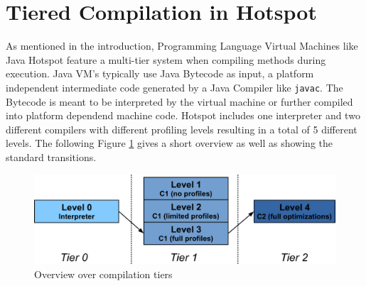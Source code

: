 \section{Tiered Compilation in Hotspot}
\label{sec:tiered}
As mentioned in the introduction, Programming Language Virtual Machines like Java Hotspot feature a multi-tier system when compiling methods during execution. 
Java VM's typically use Java Bytecode as input, a platform independent intermediate code generated by a Java Compiler like \texttt{javac}.
The Bytecode is meant to be interpreted by the virtual machine or further compiled into platform dependend machine code.
Hotspot includes one interpreter and two different compilers with different profiling levels resulting in a total of 5 different levels. The following Figure \ref{fig:hs_tiers} gives a short overview as well as showing the standard transitions.
\begin{figure}[h]
  \begin{center}
    \centering
    \includegraphics{figures/hs_tiers.png}
    \caption{Overview over compilation tiers}
    \label{fig:hs_tiers}
  \end{center}
\end{figure}

